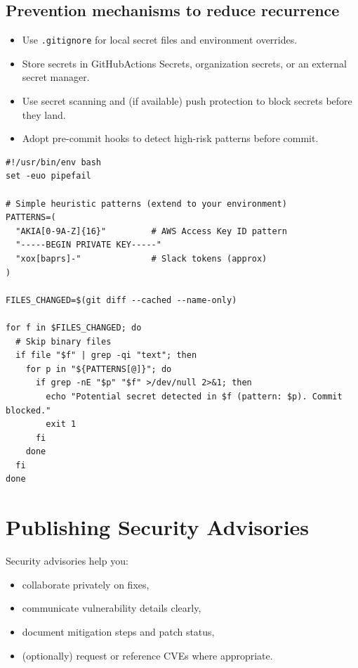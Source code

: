 \documentclass[11pt]{article}
\newcommand{\gh}{\textsf{GitHub}}
\begin{document}
\subsection{Prevention mechanisms to reduce recurrence}
\begin{checklistbox}
\begin{itemize}[leftmargin=*,itemsep=2pt]
  \item Use \texttt{.gitignore} for local secret files and environment overrides.
  \item Store secrets in \gh Actions Secrets, organization secrets, or an external secret manager.
  \item Use secret scanning and (if available) push protection to block secrets before they land.
  \item Adopt pre-commit hooks to detect high-risk patterns before commit.
\end{itemize}
\end{checklistbox}

\begin{examplebox}[title={Example: pre-commit hook for basic secret pattern detection (starter)}]
\begin{verbatim}
#!/usr/bin/env bash
set -euo pipefail

# Simple heuristic patterns (extend to your environment)
PATTERNS=(
  "AKIA[0-9A-Z]{16}"         # AWS Access Key ID pattern
  "-----BEGIN PRIVATE KEY-----"
  "xox[baprs]-"              # Slack tokens (approx)
)

FILES_CHANGED=$(git diff --cached --name-only)

for f in $FILES_CHANGED; do
  # Skip binary files
  if file "$f" | grep -qi "text"; then
    for p in "${PATTERNS[@]}"; do
      if grep -nE "$p" "$f" >/dev/null 2>&1; then
        echo "Potential secret detected in $f (pattern: $p). Commit blocked."
        exit 1
      fi
    done
  fi
done
\end{verbatim}
\end{examplebox}

\section{Publishing Security Advisories}

Security advisories help you:

\begin{itemize}[leftmargin=*,itemsep=2pt]
  \item collaborate privately on fixes,
  \item communicate vulnerability details clearly,
  \item document mitigation steps and patch status,
  \item (optionally) request or reference CVEs where appropriate.
\end{itemize}
\end{document}
